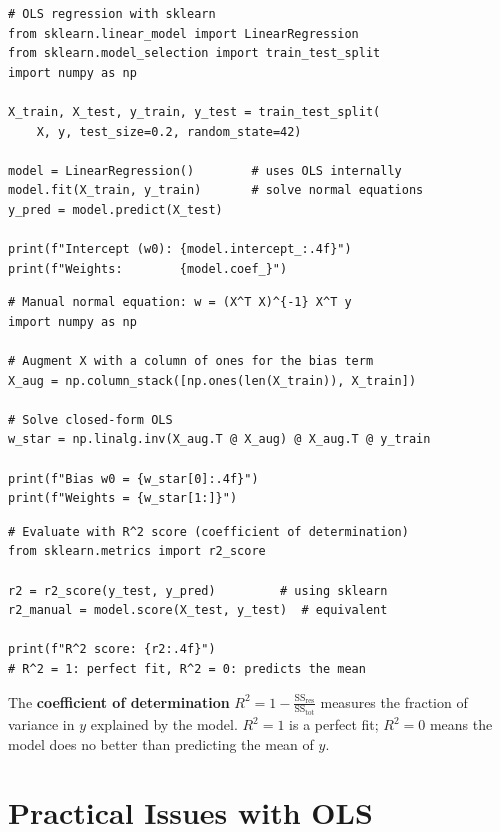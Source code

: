 \begin{lstlisting}[style=pythonstyle]
# OLS regression with sklearn
from sklearn.linear_model import LinearRegression
from sklearn.model_selection import train_test_split
import numpy as np

X_train, X_test, y_train, y_test = train_test_split(
    X, y, test_size=0.2, random_state=42)

model = LinearRegression()        # uses OLS internally
model.fit(X_train, y_train)       # solve normal equations
y_pred = model.predict(X_test)

print(f"Intercept (w0): {model.intercept_:.4f}")
print(f"Weights:        {model.coef_}")
\end{lstlisting}

\begin{lstlisting}[style=pythonstyle]
# Manual normal equation: w = (X^T X)^{-1} X^T y
import numpy as np

# Augment X with a column of ones for the bias term
X_aug = np.column_stack([np.ones(len(X_train)), X_train])

# Solve closed-form OLS
w_star = np.linalg.inv(X_aug.T @ X_aug) @ X_aug.T @ y_train

print(f"Bias w0 = {w_star[0]:.4f}")
print(f"Weights = {w_star[1:]}")
\end{lstlisting}

\begin{lstlisting}[style=pythonstyle]
# Evaluate with R^2 score (coefficient of determination)
from sklearn.metrics import r2_score

r2 = r2_score(y_test, y_pred)         # using sklearn
r2_manual = model.score(X_test, y_test)  # equivalent

print(f"R^2 score: {r2:.4f}")
# R^2 = 1: perfect fit, R^2 = 0: predicts the mean
\end{lstlisting}

\begin{remark}[$R^2$ Interpretation]
The \textbf{coefficient of determination} $R^2 = 1 - \frac{\text{SS}_{\text{res}}}{\text{SS}_{\text{tot}}}$ measures the fraction of variance in $y$ explained by the model. $R^2 = 1$ is a perfect fit; $R^2 = 0$ means the model does no better than predicting the mean of $y$.
\end{remark}

\section*{Practical Issues with OLS}

